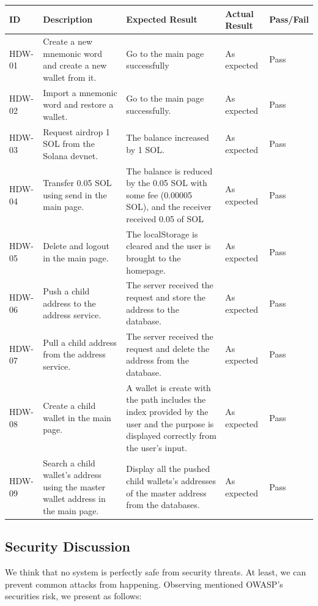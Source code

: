 \begin{tabular}{ m{1.5cm} m{4.5cm} m{5.5cm} m{3cm} m{1.5cm}}
    \toprule
    ID & Description & Expected Result & Actual Result & Pass/Fail                                            \\ 
    \midrule
    HDW-01 & Create a new mnemonic word and create a new wallet from it. & Go to the main page successfully & As expected & Pass \\ 
    HDW-02 & Import a mnemonic word and restore a wallet.  &  Go to the main page successfully. & As expected & Pass  \\ 
    HDW-03 & Request airdrop 1 SOL from the Solana devnet. &  The balance increased by 1 SOL. & As expected & Pass    \\ 
    HDW-04 & Transfer 0.05 SOL using send in the main page. &  The balance is reduced by the 0.05 SOL with some fee (0.00005 SOL), and the receiver received 0.05 of SOL & As expected & Pass   \\ 
    HDW-05 & Delete and logout in the main page. &  The localStorage is cleared and the user is brought to the homepage. & As expected & Pass   \\ 
    HDW-06 & Push a child address to the address service.&  The server received the request and store the address to the database. & As expected & Pass   \\ 
    HDW-07 & Pull a child address from the address service.&  The server received the request and delete the address from the database. & As expected & Pass   \\ 
    HDW-08 & Create a child wallet in the main page.&  A wallet is create with the path includes the index provided by the user and the purpose is displayed correctly from the user's input. & As expected & Pass   \\ 
    HDW-09 & Search a child wallet's address using the master wallet address in the main page.& Display all the pushed child wallets's addresses of the master address from the databases. & As expected & Pass   \\ 
    \bottomrule
\end{tabular}
\subsection{Security Discussion}

We think that no system is perfectly safe from security threats. At least, we can prevent common attacks from happening. Observing mentioned OWASP’s securities risk, we present as follows:

